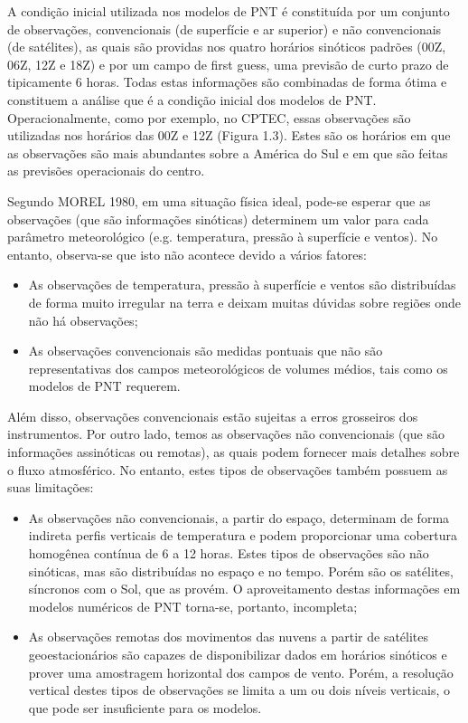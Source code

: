 A condição inicial utilizada nos modelos de PNT é constituída por um conjunto de observações, convencionais (de superfície e ar superior) e não convencionais (de satélites), as quais são providas nos quatro horários sinóticos padrões (00Z, 06Z, 12Z e 18Z) e por um campo de first guess, uma previsão de curto prazo de tipicamente 6 horas. Todas estas informações são combinadas de forma ótima e constituem a análise que é a condição inicial dos modelos de PNT. Operacionalmente, como por exemplo, no CPTEC, essas observações são utilizadas nos horários das 00Z e 12Z (Figura 1.3). Estes são os horários em que as observações são mais abundantes sobre a América do Sul e em que são feitas as previsões operacionais do centro.

Segundo MOREL 1980, em uma situação física ideal, pode-se esperar que as observações (que são informações sinóticas) determinem um valor para cada parâmetro meteorológico (e.g. temperatura, pressão à superfície e ventos). No entanto, observa-se que isto não acontece devido a vários fatores:

\begin{itemize}
\item As observações de temperatura, pressão à superfície e ventos são distribuídas de forma muito irregular na terra e deixam muitas dúvidas sobre regiões onde não há observações;
\item As observações convencionais são medidas pontuais que não são representativas dos campos meteorológicos de volumes médios, tais como os modelos de PNT requerem.
\end{itemize}

Além disso, observações convencionais estão sujeitas a erros grosseiros dos instrumentos. Por outro lado, temos as observações não convencionais (que são informações assinóticas ou remotas), as quais podem fornecer mais detalhes sobre o fluxo atmosférico. No entanto, estes tipos de observações também possuem as suas limitações:

\begin{itemize}
\item As observações não convencionais, a partir do espaço, determinam de forma indireta perfis verticais de temperatura e podem proporcionar uma cobertura homogênea contínua de 6 a 12 horas. Estes tipos de observações são não sinóticas, mas são distribuídas no espaço e no tempo. Porém são os satélites, síncronos com o Sol, que as provém. O aproveitamento destas informações em modelos numéricos de PNT torna-se, portanto, incompleta;
\item As observações remotas dos movimentos das nuvens a partir de satélites geoestacionários são capazes de disponibilizar dados em horários sinóticos e prover uma amostragem horizontal dos campos de vento. Porém, a resolução vertical destes tipos de observações se limita a um ou dois níveis verticais, o que pode ser insuficiente para os modelos.
\end{itemize}

